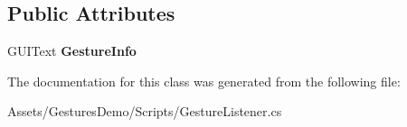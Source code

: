 \subsection*{Public Attributes}
\begin{DoxyCompactItemize}
\item 
\mbox{\label{class_gesture_listener_a86c29857f42757e33c06574f2762be0c}} 
G\+U\+I\+Text {\bfseries Gesture\+Info}
\end{DoxyCompactItemize}


The documentation for this class was generated from the following file\+:\begin{DoxyCompactItemize}
\item 
Assets/\+Gestures\+Demo/\+Scripts/Gesture\+Listener.\+cs\end{DoxyCompactItemize}
